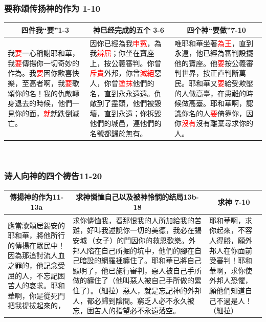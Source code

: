 \subsubsection{要称颂传扬神的作为  1-10}
\begin{table}[H]
\centering
\begin{tabular}{p{}|p{16em}|p{17.5em}}\hline\hline
\multicolumn{1}{c|}{四件我“要”1-3}&\multicolumn{1}{c|}{神已经完成的五个 3-6}&\multicolumn{1}{c}{四个神“要做”7-10}\\\hline
我\textcolor{red}{要}一心稱謝耶和華，我\textcolor{red}{要}傳揚你一切奇妙的作為。我\textcolor{red}{要}因你歡喜快樂，至高者啊，我\textcolor{red}{要}歌頌你的名！我的仇敵轉身退去的時候，他們一見你的面，\textcolor{red}{就}就跌倒滅亡。
&因你已經為我\textcolor{red}{申冤}，為我\textcolor{red}{辨屈}；你坐在寶座上，按公義審判。你曾\textcolor{red}{斥責}外邦，你曾\textcolor{red}{滅絕}惡人，你曾\textcolor{red}{塗抹}他們的名，直到永永遠遠。仇敵到了盡頭，他們被毀壞，直到永遠；你拆毀他們的城邑，連他們的名號都歸於無有。
&唯耶和華坐著\textcolor{red}{為王}，直到永遠，他已經為審判設擺他的寶座。他\textcolor{red}{要}按公義審判世界，按正直判斷萬民。耶和華又\textcolor{red}{要}給受欺壓的人做高臺，在患難的時候做高臺。耶和華啊，認識你名的人\textcolor{red}{要}倚靠你，因你\textcolor{red}{沒有}沒有離棄尋求你的人。\\\hline
\end{tabular}
\end{table} 

\subsubsection{诗人向神的四个祷告11-20}
\begin{table}[H]
\centering
\begin{tabular}{p{}|p{28em}|p{8.5em}}\hline\hline
\multicolumn{1}{c|}{傳揚神的作为11-13a}&\multicolumn{1}{c|}{求神憐恤自己以及被神怜悯的结局13b-18}&\multicolumn{1}{c}{求神 7-10}\\\hline
應當歌頌居錫安的耶和華，將他所行的傳揚在眾民中！因為那追討流人血之罪的，他記念受屈的人，不忘記困苦人的哀求。耶和華啊，你是從死門把我提拔起來的，
&求你憐恤我，看那恨我的人所加給我的苦難，好叫我述說你一切的美德，我必在錫安城 （女子）的門因你的救恩歡樂。外邦人陷在自己所掘的坑中，他們的腳在自己暗設的網羅裡纏住了。耶和華已將自己顯明了，他已施行審判，惡人被自己手所做的纏住了（他叫惡人被自己手所做的累住了）。（細拉）惡人，就是忘記神的外邦人，都必歸到陰間。窮乏人必不永久被忘，困苦人的指望必不永遠落空。
&耶和華啊，求你起來，不容人得勝，願外邦人在你面前受審判！耶和華啊，求你使外邦人恐懼，願他們知道自己不過是人！（細拉）\\\hline
\end{tabular}
\end{table} 



